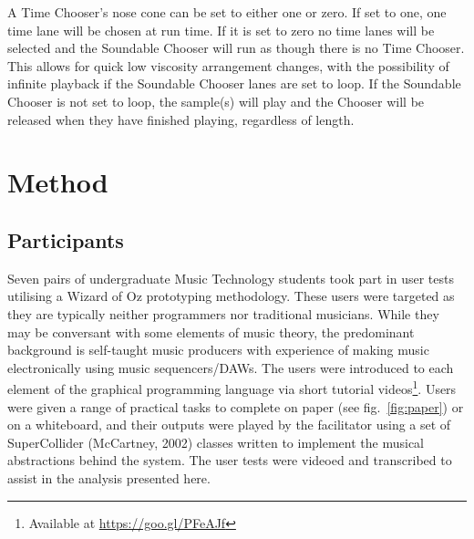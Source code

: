 \documentclass{ppig}
\begin{document}
A Time Chooser's nose cone can be set to either one or zero. If set to
one, one time lane will be chosen at run time. If it is set to zero no
time lanes will be selected and the Soundable Chooser will run as though
there is no Time Chooser. This allows for quick low viscosity
arrangement changes, with the possibility of infinite playback if the
Soundable Chooser lanes are set to loop. If the Soundable Chooser is not
set to loop, the sample(s) will play and the Chooser will be released
when they have finished playing, regardless of length.

\hypertarget{method}{%
\section{Method}\label{method}}

\hypertarget{participants}{%
\subsection{Participants}\label{participants}}

Seven pairs of undergraduate Music Technology students took part in user
tests utilising a Wizard of Oz prototyping methodology. These users were
targeted as they are typically neither programmers nor traditional
musicians. While they may be conversant with some elements of music
theory, the predominant background is self-taught music producers with
experience of making music electronically using music sequencers/DAWs.
The users were introduced to each element of the graphical programming
language via short tutorial videos\footnote{Available at
  \url{https://goo.gl/PFeAJf}}. Users were given a range of practical
tasks to complete on paper (see fig.~\ref{fig:paper}) or on a
whiteboard, and their outputs were played by the facilitator using a set
of SuperCollider (McCartney, 2002) classes written to implement the
musical abstractions behind the system. The user tests were videoed and
transcribed to assist in the analysis presented here.
\end{document}
